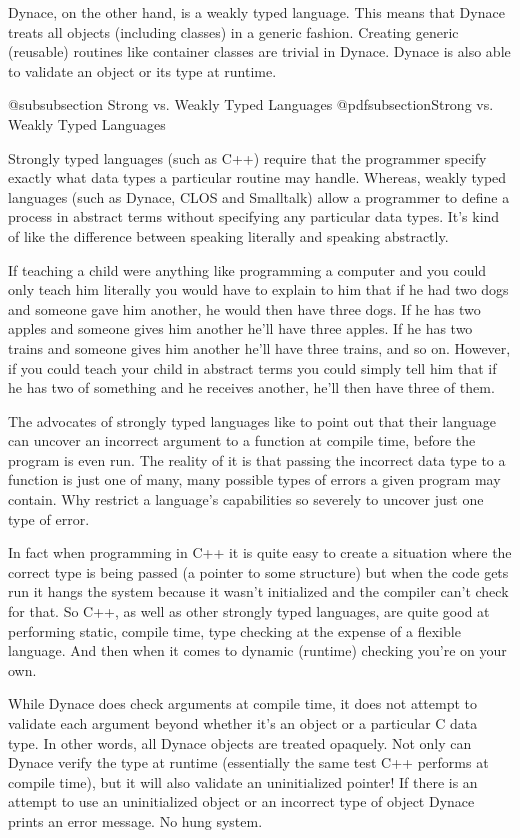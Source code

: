 Dynace, on the other hand, is a weakly typed language.  This means
that Dynace treats all objects (including classes) in a generic
fashion.  Creating generic (reusable) routines like container classes
are trivial in Dynace.  Dynace is also able to validate an object or
its type at runtime.


@subsubsection Strong vs. Weakly Typed Languages
@pdfsubsection{Strong vs. Weakly Typed Languages}

Strongly typed languages (such as C++) require that the programmer
specify exactly what data types a particular routine may handle.
Whereas, weakly typed languages (such as Dynace, CLOS and Smalltalk)
allow a programmer to define a process in abstract terms without
specifying any particular data types.  It's kind of like the
difference between speaking literally and speaking abstractly.

If teaching a child were anything like programming a computer and you
could only teach him literally you would have to explain to him that
if he had two dogs and someone gave him another, he would then have
three dogs.  If he has two apples and someone gives him another he'll
have three apples.  If he has two trains and someone gives him another
he'll have three trains, and so on.  However, if you could teach your
child in abstract terms you could simply tell him that if he has two
of something and he receives another, he'll then have three of them.

The advocates of strongly typed languages like to point out that their
language can uncover an incorrect argument to a function at compile
time, before the program is even run.  The reality of it is that passing
the incorrect data type to a function is just one of many, many possible
types of errors a given program may contain.  Why restrict a language's
capabilities so severely to uncover just one type of error.  

In fact when programming in C++ it is quite easy to create a situation
where the correct type is being passed (a pointer to some structure)
but when the code gets run it hangs the system because it wasn't
initialized and the compiler can't check for that. So C++, as well as
other strongly typed languages, are quite good at performing static,
compile time, type checking at the expense of a flexible language.
And then when it comes to dynamic (runtime) checking you're on your
own.

While Dynace does check arguments at compile time, it does not attempt
to validate each argument beyond whether it's an object or a particular
C data type.  In other words, all Dynace objects are treated opaquely.
Not only can Dynace verify the type at runtime (essentially the same
test C++ performs at compile time), but it will also validate an
uninitialized pointer!  If there is an attempt to use an uninitialized
object or an incorrect type of object Dynace prints an error message.
No hung system.

